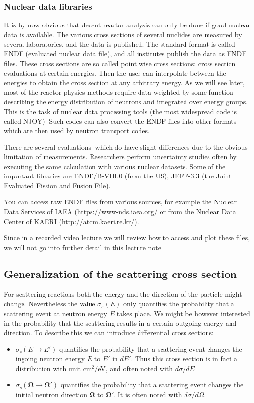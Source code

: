 \subsubsection{Nuclear data libraries}

It is by now obvious that decent reactor analysis can only be done if good nuclear data is available. The various cross sections of several nuclides are measured by several laboratories, and the data is published. The standard format is called ENDF (evaluated nuclear data file), and all institutes publish the data as ENDF files. These cross sections are so called point wise cross sections: cross section evaluations at certain energies. Then the user can interpolate between the energies to obtain the cross section at any arbitrary energy. As we will see later, most of the reactor physics methods require data weighted by some function describing the energy distribution of neutrons and integrated over energy groups. This is the task of nuclear data processing tools (the most widespread code is called NJOY). Such codes can also convert the ENDF files into other formats which are then used by neutron transport codes.

There are several evaluations, which do have slight differences due to the obvious limitation of measurements. Researchers perform uncertainty studies often by executing the same calculation with various nuclear datasets. Some of the important libraries are ENDF/B-VIII.0 (from the US), JEFF-3.3 (the Joint Evaluated Fission and Fusion File). 

You can access raw ENDF files from various sources, for example the Nuclear Data Services of IAEA (\url{https://www-nds.iaea.org/} or from the Nuclear Data Center of KAERI (\url{http://atom.kaeri.re.kr/}).

Since in a recorded video lecture we will review how to access and plot these files, we will not go into further detail in this lecture note. 

\subsection{Generalization of the scattering cross section}

For scattering reactions both the energy and the direction of the particle might change. Nevertheless the value $\sigma_s(E)$ only quantifies the probability that a scattering event at neutron energy $E$ takes place. We might be however interested in the probability that the scattering results in a certain outgoing energy and direction. To describe this we can introduce differential cross sections:
\begin{itemize}
\item $\sigma_s(E\rightarrow E')$ quantifies the probability that a scattering event changes the ingoing neutron energy $E$ to $E'$ in $dE'$. Thus this cross section is in fact a distribution with unit cm$^2/$eV, and often noted with $d\sigma/dE$
\item $\sigma_s(\mathbf{\Omega}\rightarrow \mathbf{\Omega}')$ quantifies the probability that a scattering event changes the initial neutron direction $\mathbf{\Omega}$ to $\mathbf{\Omega}'$. It is often noted with $d\sigma/d\Omega$.
\end{itemize}

